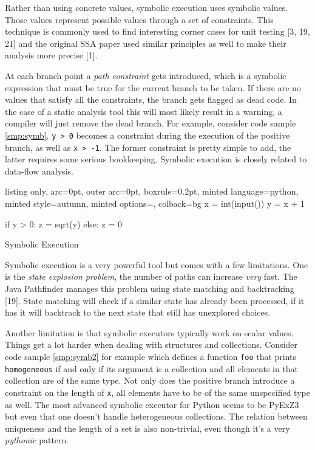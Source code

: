 \documentclass[]{article}
\begin{document}
Rather than using concrete values, symbolic execution uses symbolic
values. Those values represent possible values through a set of
constraints. This technique is commonly used to find interesting corner
cases for unit testing {[}3, 19, 21{]} and the original SSA paper used
similar principles as well to make their analysis more precise {[}1{]}.

At each branch point a \emph{path constraint} gets introduced, which is
a symbolic expression that must be true for the current branch to be
taken. If there are no values that satisfy all the constraints, the
branch gets flagged as dead code. In the case of a static analysis tool
this will most likely result in a warning, a compiler will just remove
the dead branch. For example, consider code sample \ref{smp:symb}.
\texttt{y\ \textgreater{}\ 0} becomes a constraint during the execution
of the positive branch, as well as \texttt{x\ \textgreater{}\ -1}. The
former constraint is pretty simple to add, the latter requires some
serious bookkeeping. Symbolic execution is closely related to data-flow
analysis.

\begin{code}
  \begin{tcblisting}{listing only, 
  arc=0pt,
  outer arc=0pt, 
  boxrule=0.2pt,
  minted language=python,
  minted style=autumn,
  minted options={},
  colback=bg }
x = int(input())
y = x + 1

if y > 0:
    z = sqrt(y)
else:
    z = 0
\end{tcblisting}
\caption{Symbolic Execution} \label{smp:symb}
\end{code}

Symbolic execution is a very powerful tool but comes with a few
limitations. One is the \emph{state explosion problem}, the number of
paths can increase \emph{very} fast. The Java Pathfinder manages this
problem using state matching and backtracking {[}19{]}. State matching
will check if a similar state has already been processed, if it has it
will backtrack to the next state that still has unexplored choices.

Another limitation is that symbolic executors typically work on scalar
values. Things get a lot harder when dealing with structures and
collections. Consider code sample \ref{smp:symb2} for example which
defines a function \texttt{foo} that prints \texttt{homogeneous} if and
only if its argument is a collection and all elements in that collection
are of the same type. Not only does the positive branch introduce a
constraint on the length of \texttt{x}, all elements have to be of the
same unspecified type as well. The most advanced symbolic executor for
Python seems to be PyExZ3 but even that one doesn't handle heterogeneous
collections. The relation between uniqueness and the length of a set is
also non-trivial, even though it's a very \emph{pythonic} pattern.
\end{document}
